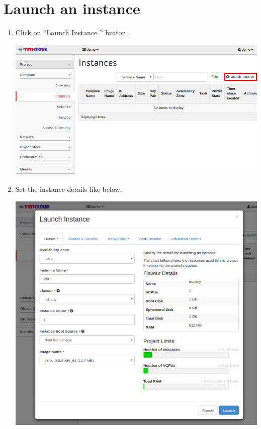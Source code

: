 \documentclass[letterpaper,10pt,english]{sphinxmanual}
\begin{document}
\begin{enumerate}
\end{enumerate}


\section{Launch an instance}
\label{_source/user_guide/launch_instance:launch-an-instance}\label{_source/user_guide/launch_instance:id2}\begin{enumerate}
\item {} 
Click on “Launch Instance ” button.

\includegraphics{instances-launch-instance.png}

\item {} 
Set the instance details like below.

\includegraphics{instances-launch-details.png}


\end{enumerate}
\end{document}
